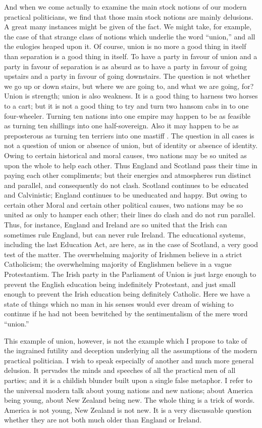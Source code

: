 And when we come actually to examine the main stock notions of our modern practical politicians, we find that those main stock notions are mainly delusions. A great many instances might be given of the fact. We might take, for example, the case of that strange class of notions which underlie the word “union,” and all the eulogies heaped upon it. Of course, union is no more a good thing in itself than separation is a good thing in itself. To have a party in favour of union and a party in favour of separation is as absurd as to have a party in favour of going upstairs and a party in favour of going downstairs. The question is not whether we go up or down stairs, but where we are going to, and what we are going, for? Union is strength; union is also weakness. It is a good thing to harness two horses to a cart; but it is not a good thing to try and turn two hansom cabs in to one four-wheeler. Turning ten nations into one empire may happen to be as feasible as turning ten shillings into one half-sovereign. Also it may happen to be as preposterous as turning ten terriers into one mastiff . The question in all cases is not a question of union or absence of union, but of identity or absence of identity. Owing to certain historical and moral causes, two nations may be so united as upon the whole to help each other. Thus England and Scotland pass their time in paying each other compliments; but their energies and atmospheres run distinct and parallel, and consequently do not clash. Scotland continues to be educated and Calvinistic; England continues to be uneducated and happy. But owing to certain other Moral and certain other political causes, two nations may be so united as only to hamper each other; their lines do clash and do not run parallel. Thus, for instance, England and Ireland are so united that the Irish can sometimes rule England, but can never rule Ireland. The educational systems, including the last Education Act, are here, as in the case of Scotland, a very good test of the matter. The overwhelming majority of Irishmen believe in a strict Catholicism; the overwhelming majority of Englishmen believe in a vague Protestantism. The Irish party in the Parliament of Union is just large enough to prevent the English education being indefinitely Protestant, and just small enough to prevent the Irish education being definitely Catholic. Here we have a state of things which no man in his senses would ever dream of wishing to continue if he had not been bewitched by the sentimentalism of the mere word “union.”

This example of union, however, is not the example which I propose to take of the ingrained futility and deception underlying all the assumptions of the modern practical politician. I wish to speak especially of another and much more general delusion. It pervades the minds and speeches of all the practical men of all parties; and it is a childish blunder built upon a single false metaphor. I refer to the universal modern talk about young nations and new nations; about America being young, about New Zealand being new. The whole thing is a trick of words. America is not young, New Zealand is not new. It is a very discussable question whether they are not both much older than England or Ireland.

